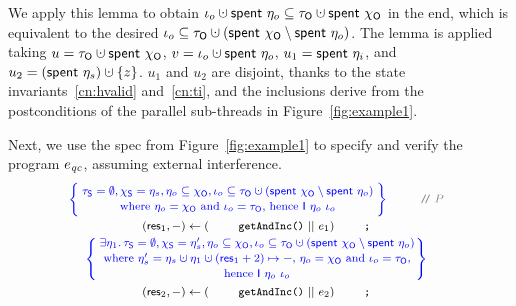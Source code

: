 We apply this lemma to obtain $\ikno \hunion \Tomb~\gisto \subseteq
\tkno \hunion \Tomb~\histo$ in the end, which is equivalent to the
desired $\ikno \subseteq \tkno \hunion (\Tomb~\histo \setminus
\Tomb~\gisto)$. The lemma is applied taking $u = \tkno \hunion
\Tomb~\histo$, $v = \ikno \hunion \Tomb~\gisto$, $u_1 =
\mathsf{spent}~\eta_i$, and $u_2= (\Tomb~\gists) \hunion \set{z}$. $u_1$ and
$u_2$ are disjoint, thanks to the state invariants~\ref{cn:hvalid}
and~\ref{cn:ti}, and the inclusions derive from the postconditions of
the parallel sub-threads in Figure~\ref{fig:example1}.

Next, we use the spec from Figure~\ref{fig:example1} to specify and
verify the program $e_{\mathit{qc}}$, assuming external interference.
%
\[
\!\!\!
{\small{
\begin{array}{c}
  \spec{\!\!
  \begin{array}{c}
    \tkns = \emptyset,
    \hists = \gists,
    \gisto \subseteq \histo, \ikno \subseteq \tkno \hunion (\Tomb~\histo \setminus \Tomb~\gisto)\\[2pt]
\mbox{where $\gisto = \histo$ and $\ikno = \tkno$, hence $\Ic{\gisto}{\ikno}$}
  \end{array}
  \!\!}
  ~\comm{P}
  \\\\[-6pt]
  (\res_1, -) \Asgn (\esc{getAndInc()} ~||~ e_1) \esc{;}
  \\[3pt]
%
%
{{
\spec{\!\!
\begin{array}{c}
 \exists \gist_1\ldot \tkns = \emptyset\aand \hists = \gists', \gisto \subseteq \histo \aand \ikno \subseteq \tkno \hunion (\Tomb~\histo \setminus \Tomb~\gisto)\\[2pt]
\mbox{where 
 $\gists' = \gists \hunion
\gist_1 \hunion (\res_1 + 2)\mapsto -$, $\gisto = \histo$ and $\ikno =
\tkno$,} \\[2pt]
\mbox{hence $\Ic{\gisto}{\ikno}$}
  \end{array}
\!\!\!}
}}
%
\\\\[-5pt]
(\res_2, -) \Asgn (\esc{getAndInc()} ~||~ e_2) \esc{;}      
\\[3pt]

\end{array}}}\]
